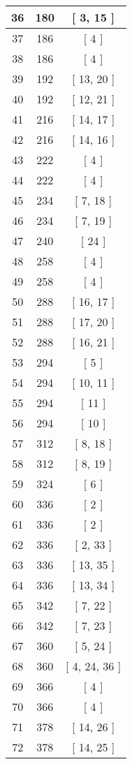 \begin{center}
\begin{longtable}[H]{|| c c c ||}
\hline
36 & 180 & [ 3, 15 ] \\ 
\hline
37 & 186 & [ 4 ] \\ 
\hline
38 & 186 & [ 4 ] \\ 
\hline
39 & 192 & [ 13, 20 ] \\ 
\hline
40 & 192 & [ 12, 21 ] \\ 
\hline
41 & 216 & [ 14, 17 ] \\ 
\hline
42 & 216 & [ 14, 16 ] \\ 
\hline
43 & 222 & [ 4 ] \\ 
\hline
44 & 222 & [ 4 ] \\ 
\hline
45 & 234 & [ 7, 18 ] \\ 
\hline
46 & 234 & [ 7, 19 ] \\ 
\hline
47 & 240 & [ 24 ] \\ 
\hline
48 & 258 & [ 4 ] \\ 
\hline
49 & 258 & [ 4 ] \\ 
\hline
50 & 288 & [ 16, 17 ] \\ 
\hline
51 & 288 & [ 17, 20 ] \\ 
\hline
52 & 288 & [ 16, 21 ] \\ 
\hline
53 & 294 & [ 5 ] \\ 
\hline
54 & 294 & [ 10, 11 ] \\ 
\hline
55 & 294 & [ 11 ] \\ 
\hline
56 & 294 & [ 10 ] \\ 
\hline
57 & 312 & [ 8, 18 ] \\ 
\hline
58 & 312 & [ 8, 19 ] \\ 
\hline
59 & 324 & [ 6 ] \\ 
\hline
60 & 336 & [ 2 ] \\ 
\hline
61 & 336 & [ 2 ] \\ 
\hline
62 & 336 & [ 2, 33 ] \\ 
\hline
63 & 336 & [ 13, 35 ] \\ 
\hline
64 & 336 & [ 13, 34 ] \\ 
\hline
65 & 342 & [ 7, 22 ] \\ 
\hline
66 & 342 & [ 7, 23 ] \\ 
\hline
67 & 360 & [ 5, 24 ] \\ 
\hline
68 & 360 & [ 4, 24, 36 ] \\ 
\hline
69 & 366 & [ 4 ] \\ 
\hline
70 & 366 & [ 4 ] \\ 
\hline
71 & 378 & [ 14, 26 ] \\ 
\hline
72 & 378 & [ 14, 25 ] \\ 

\end{longtable}
\end{center}
